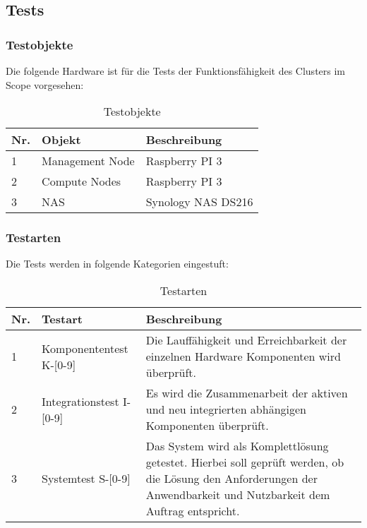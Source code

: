 \subsection{Tests}
\subsubsection{Testobjekte}
Die folgende Hardware ist für die Tests der Funktionsfähigkeit des Clusters im Scope vorgesehen:
\begin{table}[H]
\centering
\begin{tabular}{p{1cm}p{}p{7.5cm}}
\hline
\rowcolor{heading} \textbf{Nr.} & \textbf{Objekt} & \textbf{Beschreibung} \\\hline
1 & Management Node & Raspberry PI 3  \\\hline
2 & Compute Nodes & Raspberry PI 3 \\\hline
3 & NAS & Synology NAS DS216 \\\hline
\end{tabular}
\caption{Testobjekte}
\end{table}

\subsubsection{Testarten}
Die Tests werden in folgende Kategorien eingestuft:

\begin{table}[H]
\centering
\begin{tabular}{p{1cm}p{3cm}p{12cm}}
\hline
\rowcolor{heading} \textbf{Nr.} & \textbf{Testart} & \textbf{Beschreibung} \\\hline
1 & Komponententest \newline K-[0-9]& Die Lauffähigkeit und Erreichbarkeit der einzelnen Hardware Komponenten wird überprüft.  \\\hline
2 & Integrationstest \newline I-[0-9] & Es wird die Zusammenarbeit der aktiven und neu integrierten abhängigen Komponenten überprüft. \\\hline
3 & Systemtest \newline S-[0-9] & Das System wird als Komplettlösung getestet. Hierbei soll geprüft werden, ob die Lösung den Anforderungen der Anwendbarkeit und Nutzbarkeit dem Auftrag entspricht.  \\\hline
\end{tabular}
\caption{Testarten}
\end{table}

